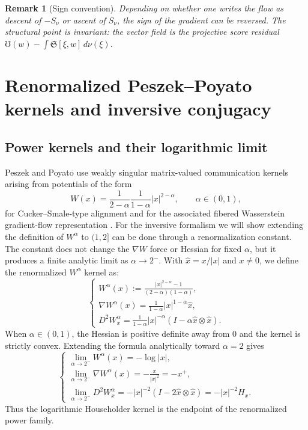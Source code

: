 \documentclass[11pt]{article}
\newtheorem{remark}[theorem]{Remark}
\newcommand{\norm}[1]{\left|#1\right|}
\newcommand{\grad}{\nabla}
\newcommand{\Hh}{ H}
\newcommand{\UU}{\mho}
\newcommand{\Sbr}[2]{\mathfrak S[#1,#2]}
\begin{document}
\begin{remark}[Sign convention]
Depending on whether one writes the flow as descent of $-S_\nu$ or ascent of $S_\nu$, the sign of the gradient can be reversed.  The structural point is invariant: the vector field is the projective score residual $\UU(w)-\int\Sbr{\xi}{w}\,d\nu(\xi)$.
\end{remark}



\section{Renormalized Peszek--Poyato kernels and inversive conjugacy}

\subsection{Power kernels and their logarithmic limit}

Peszek and Poyato use weakly singular matrix-valued communication kernels arising from potentials of the form
\[
    W(x)=\frac{1}{2-\alpha}\frac{1}{1-\alpha}\norm x^{2-\alpha},
    \qquad \alpha\in(0,1),
\]
for Cucker--Smale-type alignment and for the associated fibered Wasserstein gradient-flow representation \cite{PeszekPoyato2022Fibered,PeszekPoyato2022CS}.  For the inversive formalism we will show extending the definition of $W^\alpha$ to $(1,2]$ can be done through a renormalization constant. The constant does not change the $\nabla W$ force or Hessian for fixed $\alpha$, but it produces a finite analytic limit as $\alpha\to2^-$. With $\hat x=x/|x|$ and $x\neq0$, we define the renormalized $W^\alpha$ kernel as:
\[
\begin{cases}
\displaystyle W^\alpha(x):=\frac{\norm x^{2-\alpha}-1}{(2-\alpha)(1-\alpha)},\\[10pt] 
    \displaystyle\grad W^\alpha(x)=\frac{1}{1-\alpha}\norm x^{1-\alpha}\hat x,\\[10pt] \displaystyle
    D^2W^\alpha_x
    =\frac{1}{1-\alpha}\norm x^{-\alpha}\left(I-\alpha\hat x\otimes\hat x\right)
    .
 \end{cases}
\]
When $\alpha\in(0,1)$, the Hessian is positive definite away from $0$ and the kernel is strictly convex. Extending the formula analytically toward $\alpha=2$ gives
\[
    \begin{cases}
    \displaystyle\lim_{\alpha\to2^-}W^\alpha(x)=-\log\norm x,\\[10pt] \displaystyle
    \lim_{\alpha\to2^-}\grad W^\alpha(x)=-\frac{x}{\norm x^2}=-x^+,\\[10pt] \displaystyle
    \lim_{\alpha\to2^-}D^2W^\alpha_x
    =-\norm x^{-2}\left(I-2\hat x\otimes\hat x\right)
    =-|x|^{-2}\Hh_x.
 \end{cases}
\]
Thus the logarithmic Householder kernel is the endpoint of the renormalized power family.
\end{document}
